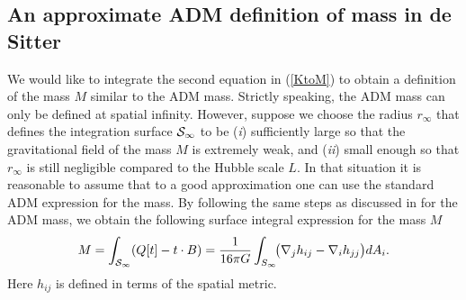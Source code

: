 \documentclass[a4paper,12pt]{article}
\newcommand{\be}{\begin{equation}}
\newcommand{\ee}{\end{equation}}
\begin{document}

\subsection{An approximate ADM definition of mass in de Sitter} 

We would like to integrate the second equation in (\ref{KtoM}) to obtain a definition of the mass $M$ similar to the ADM mass. Strictly speaking, the ADM mass can only be defined at spatial infinity. However, suppose we choose the radius $r_\infty$ that defines the integration surface ${\cal S}_\infty$  to be ({\it i}) sufficiently large so that the gravitational field of the mass $M$ is extremely weak, and ({\it ii})  small enough so that $r_\infty$ is still negligible compared to the Hubble scale $L$.  In that situation it is reasonable to assume that to a good approximation one can use the standard ADM expression for the mass.  By following the same steps as discussed in \cite{WaldNoether,Iyer-Wald} for the ADM mass, we obtain the following surface integral expression for the mass  $M$ \cite{ADM,Waldbook}
\be
\label{ADM}
M = \int_{{\cal S}_\infty}\! \left ( Q[t] - t \cdot B \right) =  {1\over 16\pi G} \int_{S_{\infty}}\! \bigl( \nabla_j h_{ij}-\nabla_i 
h_{jj} \bigr)dA_i.
\ee
Here $h_{ij}$ is defined in terms of the spatial metric. 


 



\end{document}
